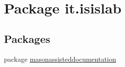 \hypertarget{namespaceit_1_1isislab}{\section{Package it.\-isislab}
\label{namespaceit_1_1isislab}
}
\subsection*{Packages}
\begin{DoxyCompactItemize}
\item 
package \hyperlink{namespaceit_1_1isislab_1_1masonassisteddocumentation}{masonassisteddocumentation}
\end{DoxyCompactItemize}
